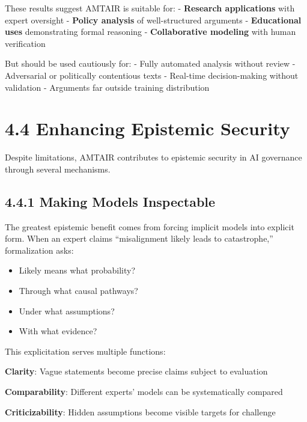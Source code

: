 \documentclass[
  11pt,
  letterpaper,
]{book}
\providecommand{\tightlist}{%
  \setlength{\itemsep}{0pt}\setlength{\parskip}{0pt}}
\begin{document}
These results suggest AMTAIR is suitable for: - \textbf{Research
applications} with expert oversight - \textbf{Policy analysis} of
well-structured arguments - \textbf{Educational uses} demonstrating
formal reasoning - \textbf{Collaborative modeling} with human
verification

But should be used cautiously for: - Fully automated analysis without
review - Adversarial or politically contentious texts - Real-time
decision-making without validation - Arguments far outside training
distribution

\section*{4.4 Enhancing Epistemic
Security}\label{sec-epistemic-security}


Despite limitations, AMTAIR contributes to epistemic security in AI
governance through several mechanisms.

\subsection*{4.4.1 Making Models
Inspectable}\label{sec-inspectable-models}

The greatest epistemic benefit comes from forcing implicit models into
explicit form. When an expert claims ``misalignment likely leads to
catastrophe,'' formalization asks:

\begin{itemize}
\tightlist
\item
  Likely means what probability?
\item
  Through what causal pathways?
\item
  Under what assumptions?
\item
  With what evidence?
\end{itemize}

This explicitation serves multiple functions:

\textbf{Clarity}: Vague statements become precise claims subject to
evaluation

\textbf{Comparability}: Different experts' models can be systematically
compared

\textbf{Criticizability}: Hidden assumptions become visible targets for
challenge
\end{document}
